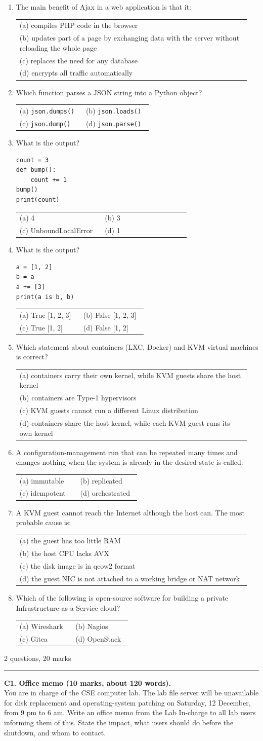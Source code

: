 \documentclass[11pt,a4paper]{article}
\makeatletter
\newcommand{\opts}[4]{\par\nopagebreak\vspace{2pt}%
\begin{tabular}{@{}p{0.47\linewidth}p{0.47\linewidth}@{}}
(a) #1 & (b) #2\\ (c) #3 & (d) #4\end{tabular}}
\newcommand{\optl}[4]{\par\nopagebreak\vspace{2pt}%
\begin{tabular}{@{}p{0.95\linewidth}@{}}
(a) #1\\ (b) #2\\ (c) #3\\ (d) #4\end{tabular}}
\newcommand{\sect}[2]{\vspace{8pt}{\large\bfseries\color{ember}#1}\hfill{\small\color{slate}#2}\par
{\color{slate}\hrule}\vspace{6pt}}
\makeatother
\begin{document}
\begin{enumerate}[resume]
\opts{\texttt{session\_start()}}{\texttt{start\_session()}}{\texttt{session\_create()}}{\texttt{begin\_session()}}
\item The main benefit of Ajax in a web application is that it:
\optl{compiles PHP code in the browser}{updates part of a page by exchanging data with the server without reloading the whole page}{replaces the need for any database}{encrypts all traffic automatically}
\item Which function parses a JSON string into a Python object?
\opts{\texttt{json.dumps()}}{\texttt{json.loads()}}{\texttt{json.dump()}}{\texttt{json.parse()}}
\item What is the output?
\begin{verbatim}
count = 3
def bump():
    count += 1
bump()
print(count)
\end{verbatim}
\opts{4}{3}{UnboundLocalError}{1}
\item What is the output?
\begin{verbatim}
a = [1, 2]
b = a
a += [3]
print(a is b, b)
\end{verbatim}
\opts{True [1, 2, 3]}{False [1, 2, 3]}{True [1, 2]}{False [1, 2]}
\item Which statement about containers (LXC, Docker) and KVM virtual machines is correct?
\optl{containers carry their own kernel, while KVM guests share the host kernel}{containers are Type-1 hypervisors}{KVM guests cannot run a different Linux distribution}{containers share the host kernel, while each KVM guest runs its own kernel}
\item A configuration-management run that can be repeated many times and changes nothing when the system is already in the desired state is called:
\opts{immutable}{replicated}{idempotent}{orchestrated}
\item A KVM guest cannot reach the Internet although the host can. The most probable cause is:
\optl{the guest has too little RAM}{the host CPU lacks AVX}{the disk image is in qcow2 format}{the guest NIC is not attached to a working bridge or NAT network}
\item Which of the following is open-source software for building a private Infrastructure-as-a-Service cloud?
\opts{Wireshark}{Nagios}{Gitea}{OpenStack}
\end{enumerate}

\newpage
\sect{Part C: Descriptive (English)}{2 questions, 20 marks}
\textbf{C1. Office memo (10 marks, about 120 words).}\\
You are in charge of the CSE computer lab. The lab file server will be unavailable for disk replacement and operating-system
patching on Saturday, 12 December, from 9 pm to 6 am. Write an office memo from the Lab In-charge to all lab users
informing them of this. State the impact, what users should do before the shutdown, and whom to contact.
\end{document}
